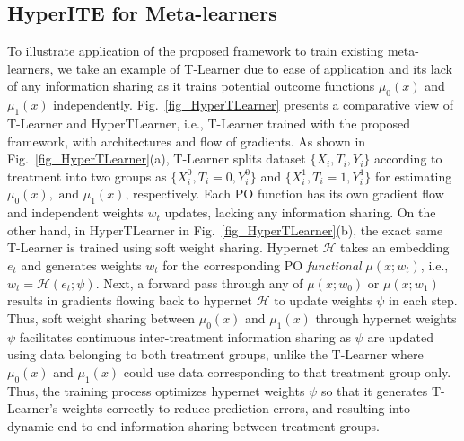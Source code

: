\documentclass{article}
\begin{document}
\subsection{HyperITE for Meta-learners}
\label{subsec_method_meta_learners}
To illustrate application of the proposed framework to train existing meta-learners, we take an example of T-Learner due to ease of application and its lack of any information sharing as it trains potential outcome functions $\mu_0(x)$ and $\mu_1(x)$ independently.
Fig.~\ref{fig_HyperTLearner} presents a comparative view of T-Learner and HyperTLearner, i.e., T-Learner trained with the proposed framework, with architectures and flow of gradients. As shown in Fig.~\ref{fig_HyperTLearner}(a), T-Learner splits dataset $\{X_i,T_i,Y_i\}$ according to treatment into two groups as $\{X_i^0,T_i=0,Y_i^0\}$ and $\{X_i^1,T_i=1,Y_i^1\}$ for estimating $\mu_0(x), \text{ and } \mu_1(x)$, respectively. Each PO function has its own gradient flow and independent weights $w_t$ updates, lacking any information sharing. On the other hand, in HyperTLearner in Fig.~\ref{fig_HyperTLearner}(b), the exact same T-Learner is trained using soft weight sharing.  Hypernet $\mathcal{H}$ takes an embedding $e_t$ and generates weights $w_t$ for the corresponding PO \textit{functional} $\mu(x;w_t)$, i.e., $w_t = \mathcal{H}(e_t;\psi)$. Next, a forward pass through any of $\mu(x;w_0)$ or $\mu(x;w_1)$ results in gradients flowing back to hypernet $\mathcal{H}$ to update weights $\psi$ in each step. Thus, soft weight sharing between $\mu_0(x)$ and $\mu_1(x)$ through hypernet weights $\psi$ facilitates continuous inter-treatment information sharing as $\psi$ are updated using data belonging to both treatment groups, unlike the T-Learner where $\mu_0(x)$ and $\mu_1(x)$ could use data corresponding to that treatment group only. Thus, the training process optimizes hypernet weights $\psi$ so that it generates T-Learner's weights correctly to reduce prediction errors, and resulting into dynamic end-to-end information sharing between treatment groups.
\end{document}
